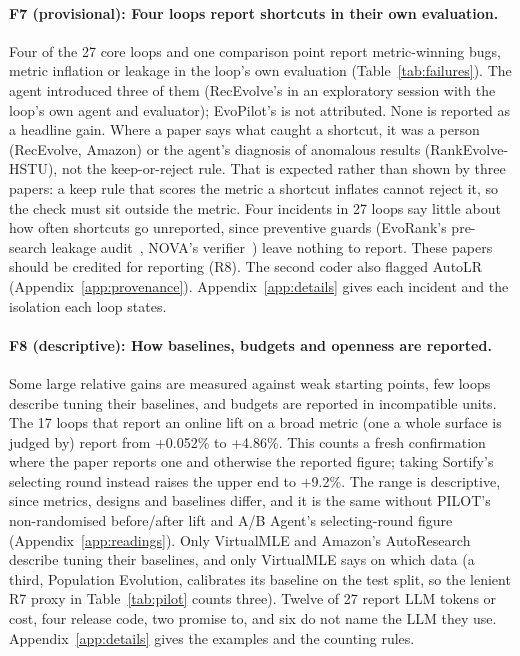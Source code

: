 \documentclass[sigconf,nonacm]{acmart}
\begin{document}
\paragraph{F7 (provisional): Four loops report shortcuts in their own evaluation.} Four of the 27 core
loops and one comparison point report metric-winning bugs, metric inflation or leakage in the loop's own evaluation (Table~\ref{tab:failures}). The agent introduced three of them (RecEvolve's in an exploratory session with the loop's own agent and evaluator); EvoPilot's is not attributed. None is reported as a headline gain. Where a paper says what caught a shortcut, it was a person (RecEvolve, Amazon) or the agent's diagnosis of anomalous results (RankEvolve-HSTU), not the keep-or-reject rule. That is expected rather than shown by three papers: a keep rule that scores the metric a shortcut inflates cannot reject it, so the check must sit outside the metric. Four incidents in 27 loops say little about how often shortcuts go unreported, since preventive guards (EvoRank's pre-search leakage audit~\cite{patel2026evorank}, NOVA's verifier~\cite{liu2026nova}) leave nothing to report. These papers should be credited for reporting (R8). The second coder also flagged AutoLR (Appendix~\ref{app:provenance}). Appendix~\ref{app:details} gives each incident and the isolation each loop states.

\paragraph{F8 (descriptive): How baselines, budgets and openness are reported.} Some large relative gains are measured against weak starting
points, few loops describe tuning their baselines, and budgets are reported in incompatible units. The 17 loops that report an online lift on a broad metric (one a whole surface is judged by) report from +0.052\% to +4.86\%. This counts a fresh confirmation where the paper reports one and otherwise the reported figure; taking Sortify's selecting round instead raises the upper end to +9.2\%. The range is descriptive, since metrics, designs and baselines differ, and it is the same without PILOT's non-randomised before/after lift and A/B Agent's selecting-round figure (Appendix~\ref{app:readings}). Only VirtualMLE and Amazon's AutoResearch describe tuning their
baselines, and only VirtualMLE says on which data (a third, Population Evolution, calibrates its baseline on the test split, so the lenient R7 proxy in Table~\ref{tab:pilot} counts three). Twelve of 27 report
LLM tokens or cost, four release code, two promise to, and six do not name the LLM they use. Appendix~\ref{app:details} gives the examples and the counting rules.
\end{document}
